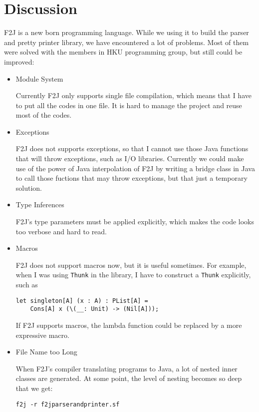 \chapter{Discussion}

F2J is a new born programming language. While we using it to build the parser and pretty printer library, we have encountered a lot of problems. Most of them were solved with the members in HKU programming group, but still could be improved:

\begin{itemize}
\item Module System

Currently F2J only supports single file compilation, which means that I have to put all the codes in one file. It is hard to manage the project and reuse most of the codes. 
\item Exceptions

F2J does not supports exceptions, so that I cannot use those Java functions that will throw exceptions, such as I/O libraries. Currently we could make use of the power of Java interpolation of F2J by writing a bridge class in Java to call those fuctions that may throw exceptions, but that just a temporary solution.

\item Type Inferences

F2J's type parameters must be applied explicitly, which makes the code looks too verbose and hard to read.

\item Macros

F2J does not support macros now, but it is useful sometimes. For example, when I was using \texttt{Thunk} in the library, I have to construct a \texttt{Thunk} explicitly, such as

\begin{lstlisting}
let singleton[A] (x : A) : PList[A] =
    Cons[A] x (\(__: Unit) -> (Nil[A]));
\end{lstlisting}

If F2J supports macros, the lambda function could be replaced by a more expressive macro.



\item File Name too Long

When F2J's compiler translating programs to Java, a lot of nested inner classes are generated. At some point, the level of nesting becomes so deep that we get:

\begin{lstlisting}
f2j -r f2jparserandprinter.sf


\end{lstlisting}
\end{itemize}
